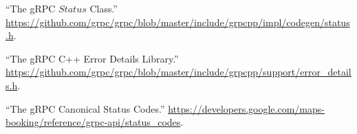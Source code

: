 \documentclass[11pt]{article}
\begin{document}
{{\begin{thebibliography}{37}
\mdbibitemlabel{{}[31]}\textquotedblleft{}The gRPC $Status$ Class.\textquotedblright{} \href{https://github.com/grpc/grpc/blob/master/include/grpcpp/impl/codegen/status.h}{{\ttfamily https://\hspace{0pt}github.\hspace{0pt}com/\hspace{0pt}grpc/\hspace{0pt}grpc/\hspace{0pt}blob/\hspace{0pt}master/\hspace{0pt}include/\hspace{0pt}grpcpp/\hspace{0pt}impl/\hspace{0pt}codegen/\hspace{0pt}status.\hspace{0pt}h}}.\label{grpcstatus}%

\mdbibitemlabel{{}[32]}\textquotedblleft{}The gRPC C++ Error Details Library.\textquotedblright{} \href{https://github.com/grpc/grpc/blob/master/include/grpcpp/support/error_details.h}{{\ttfamily https://\hspace{0pt}github.\hspace{0pt}com/\hspace{0pt}grpc/\hspace{0pt}grpc/\hspace{0pt}blob/\hspace{0pt}master/\hspace{0pt}include/\hspace{0pt}grpcpp/\hspace{0pt}support/\hspace{0pt}error\_\hspace{0pt}details.\hspace{0pt}h}}.\label{grpcerrordetails}%

\mdbibitemlabel{{}[33]}\textquotedblleft{}The gRPC Canonical Status Codes.\textquotedblright{} \href{https://developers.google.com/maps-booking/reference/grpc-api/status_codes}{{\ttfamily https://\hspace{0pt}developers.\hspace{0pt}google.\hspace{0pt}com/\hspace{0pt}maps-\hspace{0pt}booking/\hspace{0pt}reference/\hspace{0pt}grpc-\hspace{0pt}api/\hspace{0pt}status\_\hspace{0pt}codes}}.\label{grpcstatuscodes}%


\end{thebibliography}}}
\end{document}
